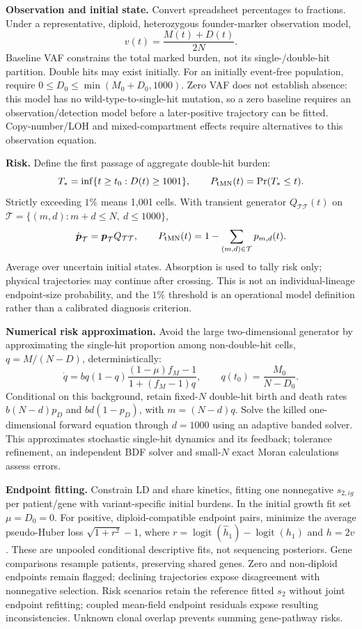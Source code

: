 \documentclass[10pt]{article}
\begin{document}
\textbf{Observation and initial state.} Convert spreadsheet percentages to fractions. Under a representative, diploid, heterozygous founder-marker observation model,
\[
v(t)=\frac{M(t)+D(t)}{2N}.
\]
Baseline VAF constrains the total marked burden, not its single-/double-hit partition. Double hits may exist initially. For an initially event-free population, require \(0\le D_0\le\min(M_0+D_0,1000)\). Zero VAF does not establish absence: this model has no wild-type-to-single-hit mutation, so a zero baseline requires an observation/detection model before a later-positive trajectory can be fitted. Copy-number/LOH and mixed-compartment effects require alternatives to this observation equation.

\newpage
\textbf{Risk.} Define the first passage of aggregate double-hit burden:
\[
T_*=\inf\{t\ge t_0:D(t)\ge1001\},\qquad
P_{\rm tMN}(t)=\Pr(T_*\le t).
\]
Strictly exceeding \(1\%\) means 1,001 cells. With transient generator \(Q_{\mathcal T\mathcal T}(t)\) on
\(\mathcal T=\{(m,d):m+d\le N,\ d\le1000\}\),
\[
\dot{\boldsymbol p}_{\mathcal T}
 =\boldsymbol p_{\mathcal T}Q_{\mathcal T\mathcal T},\qquad
P_{\rm tMN}(t)=1-\sum_{(m,d)\in\mathcal T}p_{m,d}(t).
\]
Average over uncertain initial states. Absorption is used to tally risk only; physical trajectories may continue after crossing. This is not an individual-lineage endpoint-size probability, and the \(1\%\) threshold is an operational model definition rather than a calibrated diagnosis criterion.

\textbf{Numerical risk approximation.} Avoid the large two-dimensional generator by approximating the single-hit proportion among non-double-hit cells, \(q=M/(N-D)\), deterministically:
\[
\dot q=bq(1-q)\frac{(1-\mu)f_M-1}{1+(f_M-1)q},\qquad
q(t_0)=\frac{M_0}{N-D_0}.
\]
Conditional on this background, retain fixed-\(N\) double-hit birth and death rates \(b(N-d)p_D\) and \(bd(1-p_D)\), with \(m=(N-d)q\). Solve the killed one-dimensional forward equation through \(d=1000\) using an adaptive banded solver. This approximates stochastic single-hit dynamics and its feedback; tolerance refinement, an independent BDF solver and small-\(N\) exact Moran calculations assess errors.

\textbf{Endpoint fitting.} Constrain LD and share kinetics, fitting one nonnegative \(s_{2,ig}\) per patient/gene with variant-specific initial burdens. In the initial growth fit set \(\mu=D_0=0\). For positive, diploid-compatible endpoint pairs, minimize the average pseudo-Huber loss \(\sqrt{1+r^2}-1\), where \(r=\operatorname{logit}(\hat h_1)-\operatorname{logit}(h_1)\) and \(h=2v\). These are unpooled conditional descriptive fits, not sequencing posteriors. Gene comparisons resample patients, preserving shared genes. Zero and non-diploid endpoints remain flagged; declining trajectories expose disagreement with nonnegative selection. Risk scenarios retain the reference fitted \(s_2\) without joint endpoint refitting; coupled mean-field endpoint residuals expose resulting inconsistencies. Unknown clonal overlap prevents summing gene-pathway risks.
\end{document}
